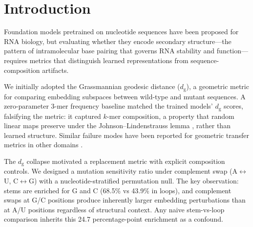 \documentclass[11pt]{article}
\newcommand{\dg}{d_{\mathrm{g}}}
\begin{document}
\section{Introduction}
\label{sec:intro}

Foundation models pretrained on nucleotide sequences have been
proposed for RNA biology, but evaluating whether they encode secondary
structure---the pattern of intramolecular base pairing that governs
RNA stability and function---requires metrics that distinguish learned
representations from sequence-composition artifacts.

We initially adopted the Grassmannian geodesic distance ($\dg$), a
geometric metric for comparing embedding subspaces between wild-type
and mutant sequences.  A zero-parameter 3-mer frequency baseline
matched the trained models' $\dg$ scores, falsifying the metric: it
captured $k$-mer composition, a property that random linear maps
preserve under the Johnson--Lindenstrauss lemma
\citep{johnson1984extensions}, rather than learned structure.  Similar
failure modes have been reported for geometric transfer metrics in
other domains \citep{tower2026boundary}.

The $\dg$ collapse motivated a replacement metric with explicit
composition controls.  We designed a mutation sensitivity ratio under
complement swap (A$\leftrightarrow$U, C$\leftrightarrow$G) with a
nucleotide-stratified permutation null.  The key observation: stems
are enriched for G and C (68.5\% vs 43.9\% in loops), and complement
swaps at G/C positions produce inherently larger embedding
perturbations than at A/U positions regardless of structural context.
Any naive stem-vs-loop comparison inherits this 24.7 percentage-point
enrichment as a confound.
\end{document}
